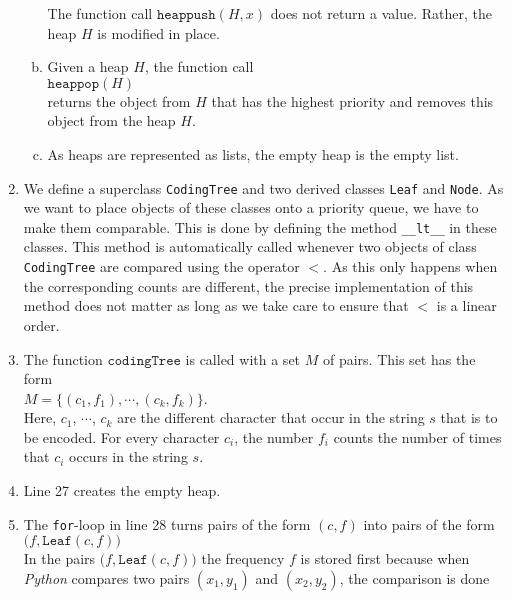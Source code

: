 \begin{enumerate}
\begin{enumerate}[(a)]
            The function call $\texttt{heappush}(H, x)$ does not return a value.  Rather, the heap $H$ is
            modified in place.
      \item Given a heap $H$, the function call
            \\[0.2cm]
            \hspace*{1.3cm}
            $\texttt{heappop}(H)$
            \\[0.2cm]
            returns the object from $H$ that has the highest priority and removes this object from the heap
            $H$.
      \item As heaps are represented as lists, the empty heap is the empty list.
      \end{enumerate}
\item We define a superclass \texttt{CodingTree} and two derived classes \texttt{Leaf} and \texttt{Node}.
      As we want to place objects of these classes onto a priority queue, we have to make them comparable.
      This is done by defining the method \texttt{\_\_lt\_\_} in these classes.  This method is automatically 
      called whenever two objects of class \texttt{CodingTree} are compared using the operator $<$.
      As this only happens when the corresponding counts are different, the precise implementation of this
      method does not matter as long as we take care to ensure that $<$ is a linear order.
\item The function $\texttt{codingTree}$ is called with a set  $M$ of pairs.  This set has the form
      \\[0.2cm]
      \hspace*{1.3cm}
      $M = \bigl\{ (c_1, f_1), \cdots, (c_k, f_k) \bigr\}$.
      \\[0.2cm]
      Here, $c_1$, $\cdots$, $c_k$ are the different character that occur in the string $s$ that is to be encoded. 
      For every character $c_i$, the number $f_i$ counts the number of times that $c_i$ occurs in the string
      $s$.
\item Line 27 creates the empty heap.
\item The \texttt{for}-loop in line 28 turns pairs of the form $(c, f)$ into pairs of the form
      \\[0.2cm]
      \hspace*{1.3cm}
      $\bigl(f, \texttt{Leaf}(c, f)\bigr)$
      \\[0.2cm]
      In the pairs $\bigl(f, \texttt{Leaf}(c, f)\bigr)$ the frequency $f$ is stored first because
      when \textsl{Python} compares two pairs $(x_1, y_1)$ and $(x_2, y_2)$, the comparison is done

\end{enumerate}
